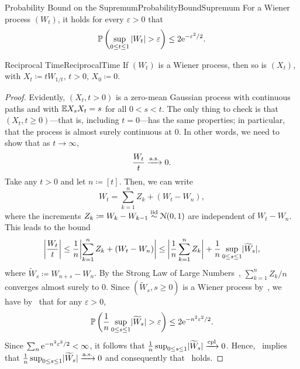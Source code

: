\begin{lem}{Probability Bound on the Supremum}{ProbabilityBoundSupremum}
	For a Wiener process \((W_t)\), it holds for every \(\varepsilon > 0\) that
	\begin{equation*}
		\Prob \left( \sup_{0 \le t \le 1} |W_t| > \varepsilon \right) \le 2 \e^{-\varepsilon^2/2}.
	\end{equation*}
\end{lem}


\begin{thm}{Reciprocal Time}{ReciprocalTime}
	If \((W_t)\) is a Wiener process, then so is \((X_t)\), with \(X_t \coloneqq t W_{1/t}, \, t > 0, \, X_0 \coloneqq 0\).
\end{thm}

\begin{proof}
	Evidently, \((X_t, t > 0)\) is a zero-mean Gaussian process with continuous paths and with \(\E X_s X_t = s\) for all \(0 < s < t\). The only thing to check is that \((X_t, t \ge 0)\)—that is, including \(t = 0\)—has the same properties; in particular, that the process is almost surely continuous at \(0\). In other words, we need to show that as \(t \to \infty\),
	\begin{equation}\label{eq:AlmostSureLimitAtInfinity}
		\frac{W_t}{t} \cas 0.
	\end{equation}
	Take any \(t > 0\) and let \(n \coloneqq [t]\). Then, we can write
	\[
		W_t = \sum_{k=1}^n Z_k + (W_t - W_n),
	\]
	where the increments \(Z_k \coloneqq W_k - W_{k-1} \simiid \Nor(0, 1)\) are independent of \(W_t - W_n\). This leads to the bound
	\[
		\abs[\bigg]{\frac{W_t}{t}}
		\le \frac{1}{n} \abs[\bigg]{\sum_{k=1}^n Z_k + (W_t - W_n)}
		\le \abs[\bigg]{\frac{1}{n} \sum_{k=1}^n Z_k} + \frac{1}{n} \sup_{0 \le s \le 1} \abs{\widetilde{W}_s},
	\]
	where \(\widetilde{W}_s \coloneqq W_{n+s} - W_n\). By the Strong Law of Large Numbers~, \(\sum_{k=1}^n Z_k/n\) converges almost surely to \(0\). Since \((\widetilde{W}_s, s \ge 0)\) is a Wiener process by~, we have by~ that for any \(\varepsilon > 0\),
	\[
		\Prob\left( \frac{1}{n} \sup_{0 \le s \le 1} \abs{\widetilde{W}_s} > \varepsilon \right)
		\le 2 \e^{-n^2 \varepsilon^2/2}.
	\]
	Since \(\sum_n \e^{-n^2 \varepsilon^2/2} < \infty\), it follows that \(\frac{1}{n} \sup_{0 \le s \le 1} \abs{\widetilde{W}_s} \xrightarrow{\mathrm{cpl}} 0\). Hence,~ implies that \(\frac{1}{n} \sup_{0 \le s \le 1} \abs{\widetilde{W}_s} \cas 0\) and consequently that~ holds.
\end{proof}


